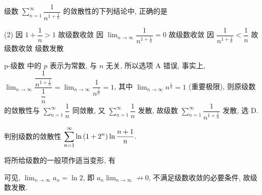 \begin{example}
    级数 $\displaystyle\sum_{n=1}^{\infty}\dfrac{1}{n^{1+\frac{1}{n}}}$ 的敛散性的下列结论中, 正确的是
    \begin{tasks}(2)
        \task 因 $1+\dfrac{1}{n}>1$ 故级数收敛
        \task 因 $\displaystyle\lim_{n\to\infty}\dfrac{1}{n^{1+\frac{1}{n}}}=0$ 故级数收敛
        \task 因 $\dfrac{1}{n^{1+\frac{1}{n}}}<\dfrac{1}{n}$ 故级数收敛
        \task 级数发散
    \end{tasks}
\end{example}
\begin{solution}
    p-级数 中的 $p$ 表示为常数, 与 $n$ 无关, 所以选项 A 错误, 事实上, $\displaystyle \lim_{n\to\infty}\dfrac{\dfrac{1}{n^{1+\frac{1}{n}}}}{\dfrac{1}{n}}=\lim_{n\to\infty}\dfrac{1}{n^{\frac{1}{n}}}=1$, 其中 $\displaystyle\lim_{n\to\infty}n^{\frac{1}{n}}=1$ (重要极限),
    则原级数的敛散性与 $\displaystyle\sum_{n=1}^{\infty}\dfrac{1}{n}$ 同敛散, 又 $\displaystyle\sum_{n=1}^{\infty}\dfrac{1}{n}$ 发散, 故级数 $\displaystyle\sum_{n=1}^{\infty}\dfrac{1}{n^{1+\frac{1}{n}}}$ 发散, 选 D.
\end{solution}


\begin{example}
    判别级数的敛散性 $\displaystyle\sum_{n=1}^{\infty}\ln\qty(1+2^n)\ln\dfrac{n+1}{n}.$
\end{example}
\begin{solution}
    将所给级数的一般项作适当变形, 有
    可见, $\displaystyle\lim_{n\to\infty}a_n=\ln 2$, 即 $\displaystyle a_n\lim_{n\to\infty}\not\to0$, 不满足级数收敛的必要条件, 故级数发散.
\end{solution}

